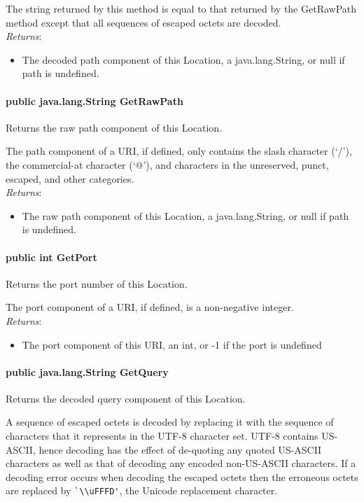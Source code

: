 \documentclass[$Date: 2003/06/26 19:29:31 $]{glabarticle}
\begin{document}
 The string returned by this method is equal to that returned by the
 GetRawPath method except that all sequences of escaped octets are
 decoded.\\
 
 \textit{Returns}:
 \begin{itemize}
 \item[] The decoded path component of this Location, a java.lang.String, or null if path is undefined.
 \end{itemize}
 
\paragraph{public java.lang.String GetRawPath}

 Returns the raw path component of this Location.

 The path component of a URI, if defined, only contains the slash
 character (`/'), the commercial-at character (`@'), and characters in
 the unreserved, punct, escaped, and other categories.\\
  
 \textit{Returns}:
 \begin{itemize}
 \item[] The raw path component of this Location, a java.lang.String, or null if path is undefined.
 \end{itemize}
  
\paragraph{public int GetPort}

 Returns the port number of this Location.
 
 The port component of a URI, if defined, is a non-negative  integer.\\
 
 \textit{Returns}:
 \begin{itemize}
 \item[] The port component of this URI, an int, or -1 if the port is undefined
 \end{itemize} 
 
\paragraph{public java.lang.String GetQuery}

 Returns the decoded query component of this Location.
 
 A sequence of escaped octets is decoded by replacing it with the
 sequence of characters that it represents in the UTF-8 character set.
 UTF-8 contains US-ASCII, hence decoding has the effect of de-quoting
 any quoted US-ASCII characters as well as that of decoding any
 encoded non-US-ASCII characters.  If a decoding error occurs when
 decoding the escaped octets then the erroneous octets are replaced by
 \verb"`\\uFFFD'", the Unicode replacement character.
 
\end{document}
